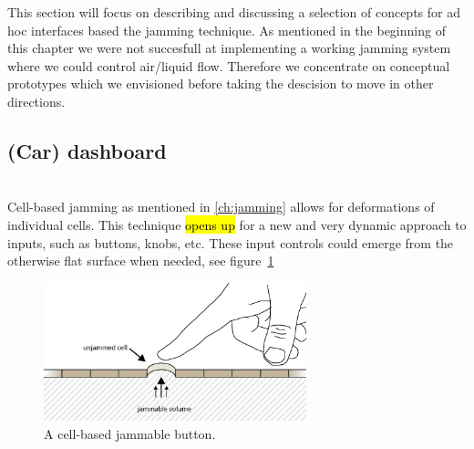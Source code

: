 This section will focus on describing and discussing a selection of concepts for ad hoc interfaces based the jamming technique.
As mentioned in the beginning of this chapter we were not succesfull at implementing a working jamming system where we could control air/liquid flow. 
Therefore we concentrate on conceptual prototypes which we envisioned before taking the descision to move in other directions.

\subsection{(Car) dashboard} 

\\

Cell-based jamming as mentioned in \ref{ch:jamming} allows for deformations of individual cells.
This technique \hl{opens up} for a new and very dynamic approach to inputs, such as buttons, knobs, etc.
These input controls could emerge from the otherwise flat surface when needed, see figure~\ref{fig:ch:jamming:concepts:button} 

\begin{figure}[h]
  \centering
      \includegraphics[width=3in]{figures/jamming/concepts/button}
  \caption[A cell-based jammable button.]
  {A cell-based jammable button.}
  \label{fig:ch:jamming:concepts:button}
\end{figure}



